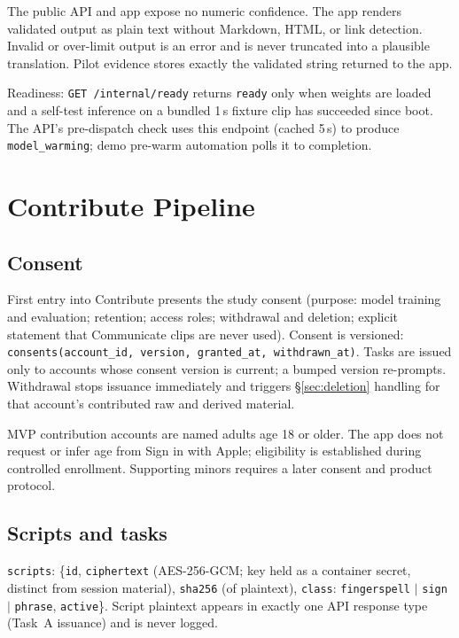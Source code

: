 \documentclass[11pt]{article}
\newcommand{\code}[1]{\texttt{#1}}
\begin{document}
The public API and app expose no numeric confidence. The app renders validated output
as plain text without Markdown, HTML, or link detection. Invalid or over-limit output is an error and is never truncated
into a plausible translation. Pilot evidence stores exactly the validated string
returned to the app.

Readiness: \code{GET /internal/ready} returns \code{ready} only when weights are
loaded and a self-test inference on a bundled 1\,s fixture clip has succeeded since
boot. The API's pre-dispatch check uses this endpoint (cached 5\,s) to produce
\code{model\_warming}; demo pre-warm automation polls it to completion.

\section{Contribute Pipeline}
\label{sec:contribute}

\subsection{Consent}

First entry into Contribute presents the study consent (purpose: model training and
evaluation; retention; access roles; withdrawal and deletion; explicit statement
that Communicate clips are never used). Consent is versioned:
\code{consents(account\_id, version, granted\_at, withdrawn\_at)}. Tasks are issued
only to accounts whose consent version is current; a bumped version re-prompts.
Withdrawal stops issuance immediately and triggers \S\ref{sec:deletion} handling
for that account's contributed raw and derived material.

MVP contribution accounts are named adults age 18 or older. The app does not request
or infer age from Sign in with Apple; eligibility is established during controlled
enrollment. Supporting minors requires a later consent and product protocol.

\subsection{Scripts and tasks}

\code{scripts}: \{\code{id}, \code{ciphertext} (AES-256-GCM; key held as a
container secret, distinct from session material), \code{sha256} (of plaintext),
\code{class}: \code{fingerspell} $|$ \code{sign} $|$ \code{phrase}, \code{active}\}.
Script plaintext appears in exactly one API response type (Task~A issuance) and is
never logged.
\end{document}
